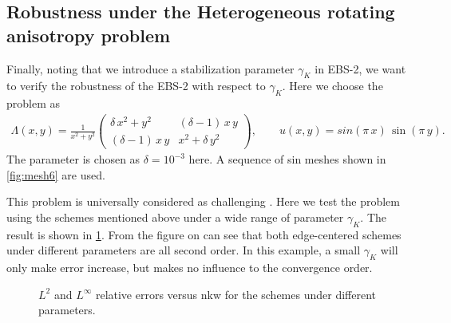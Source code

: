 \documentclass[times,review,preprint,authoryear]{elsarticle}
\begin{document}
\subsection{Robustness under the Heterogeneous rotating anisotropy problem}

Finally, noting that we introduce a stabilization parameter $\gamma_K$ in EBS-2, we want to verify the robustness of the EBS-2 with respect to $\gamma_K$. Here we choose the problem as
\begin{align*}
\Lambda(x,y) = 
\frac{1}{x^2 + y^2}
\left(
\begin{matrix}
\delta \, x^2 + y^2 & (\delta-1) \, x \, y \\
(\delta-1) \, x \, y  & x^2 + \delta \, y^2
\end{matrix}
\right),
\qquad
u(x,y) = sin(\pi \, x) \, \sin(\pi \, y).
\end{align*}
The parameter is chosen as $\delta = 10^{-3}$ here. A sequence of sin meshes shown in \cref{fig:mesh6} are used.

This problem is universally considered as challenging \cite{???}. Here we test the problem using the schemes mentioned above under a wide range of parameter $\gamma_K$. The result is shown in \cref{fig:error}. From the figure on can see that both edge-centered schemes under different parameters are all second order. In this example, a small $\gamma_K$ will only make error increase, but makes no influence to the convergence order.

\begin{figure}[h]
\centering
{}
\caption{$L^2$ and $L^\infty$ relative errors versus nkw for the schemes under different parameters.}
\label{fig:error}
\end{figure}
\end{document}

